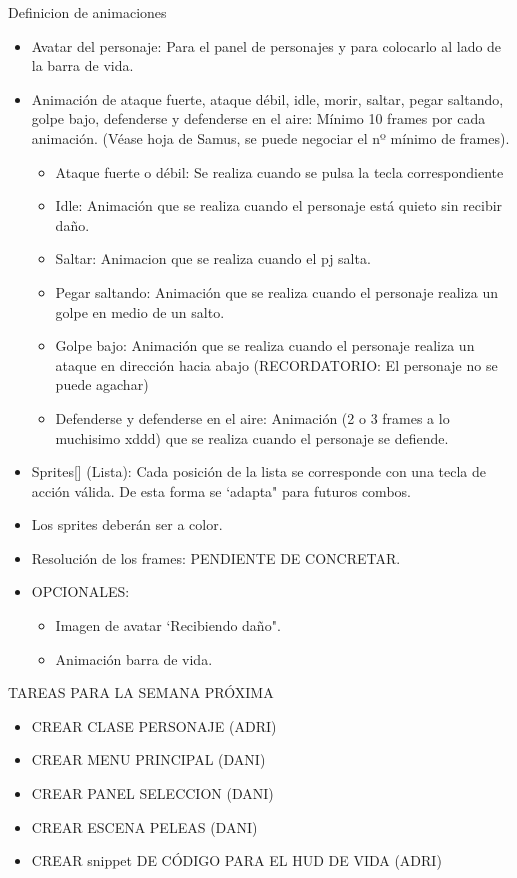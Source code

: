 \documentclass[10pt,a4paper,titlepage]{article}
\begin{document}
Definicion de animaciones 
\begin{itemize}
	\item Avatar del personaje: Para el panel de personajes y para colocarlo al lado de la barra de vida.
	\item Animación de ataque fuerte, ataque débil, idle, morir, saltar, pegar saltando, golpe bajo, defenderse y defenderse en el aire: Mínimo 10 frames por cada animación. (Véase hoja de Samus, se puede negociar el nº mínimo de frames).
	\begin{itemize}
		\item Ataque fuerte o débil: Se realiza cuando se pulsa la tecla correspondiente
		\item Idle: Animación que se realiza cuando el personaje está quieto sin recibir daño.
		\item Saltar: Animacion que se realiza cuando el pj salta.
		\item Pegar saltando: Animación que se realiza cuando el personaje realiza un golpe en medio de un salto.
		\item Golpe bajo: Animación que se realiza cuando el personaje realiza un ataque en dirección hacia abajo (RECORDATORIO: El personaje no se puede agachar)
		\item Defenderse y defenderse en el aire: Animación (2 o 3 frames a lo muchisimo xddd) que se realiza cuando el personaje se defiende.
	\end{itemize}
	\item Sprites[] (Lista): Cada posición de la lista se corresponde con una tecla de acción válida. De esta forma se `adapta" para futuros combos.
	\item Los sprites deberán ser a color.
	\item Resolución de los frames: PENDIENTE DE CONCRETAR.
	\item OPCIONALES: 
	\begin{itemize}
		\item Imagen de avatar `Recibiendo daño".
		\item Animación barra de vida.
	\end{itemize}
\end{itemize}


TAREAS PARA LA SEMANA PRÓXIMA
\begin{itemize}
	\item CREAR CLASE PERSONAJE (ADRI)
	\item CREAR MENU PRINCIPAL (DANI)
	\item CREAR PANEL SELECCION (DANI)
	\item CREAR ESCENA PELEAS (DANI)
	\item CREAR snippet DE CÓDIGO PARA EL HUD DE VIDA (ADRI)
\end{itemize}
\end{document}
